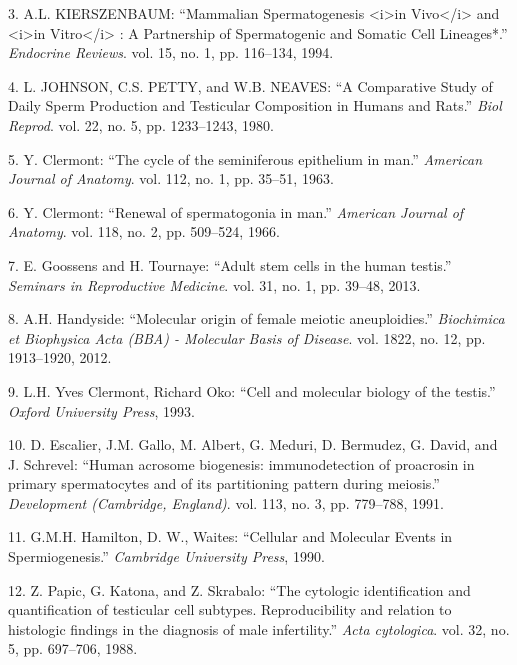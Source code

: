 \documentclass[12pt,twoside]{reedthesis}
\theoremstyle{definition}
\theoremstyle{definition}
\theoremstyle{remark}
\begin{document}
  \hypertarget{ref-KIERSZENBAUM1994}{}
  3. A.L. KIERSZENBAUM: ``Mammalian Spermatogenesis
  \textless{}i\textgreater{}in Vivo\textless{}/i\textgreater{} and
  \textless{}i\textgreater{}in Vitro\textless{}/i\textgreater{} : A
  Partnership of Spermatogenic and Somatic Cell Lineages*.''
  \emph{Endocrine Reviews}. vol. 15, no. 1, pp. 116--134, 1994.
  
  \hypertarget{ref-Johnson1980}{}
  4. L. JOHNSON, C.S. PETTY, and W.B. NEAVES: ``A Comparative Study of
  Daily Sperm Production and Testicular Composition in Humans and Rats.''
  \emph{Biol Reprod}. vol. 22, no. 5, pp. 1233--1243, 1980.
  
  \hypertarget{ref-Clermont1963}{}
  5. Y. Clermont: ``The cycle of the seminiferous epithelium in man.''
  \emph{American Journal of Anatomy}. vol. 112, no. 1, pp. 35--51, 1963.
  
  \hypertarget{ref-Clermont1966}{}
  6. Y. Clermont: ``Renewal of spermatogonia in man.'' \emph{American
  Journal of Anatomy}. vol. 118, no. 2, pp. 509--524, 1966.
  
  \hypertarget{ref-Goossens2013}{}
  7. E. Goossens and H. Tournaye: ``Adult stem cells in the human
  testis.'' \emph{Seminars in Reproductive Medicine}. vol. 31, no. 1, pp.
  39--48, 2013.
  
  \hypertarget{ref-Handyside2012}{}
  8. A.H. Handyside: ``Molecular origin of female meiotic aneuploidies.''
  \emph{Biochimica et Biophysica Acta (BBA) - Molecular Basis of Disease}.
  vol. 1822, no. 12, pp. 1913--1920, 2012.
  
  \hypertarget{ref-YvesClermontRichardOko1993}{}
  9. L.H. Yves Clermont, Richard Oko: ``Cell and molecular biology of the
  testis.'' \emph{Oxford University Press}, 1993.
  
  \hypertarget{ref-Escalier1991}{}
  10. D. Escalier, J.M. Gallo, M. Albert, G. Meduri, D. Bermudez, G.
  David, and J. Schrevel: ``Human acrosome biogenesis: immunodetection of
  proacrosin in primary spermatocytes and of its partitioning pattern
  during meiosis.'' \emph{Development (Cambridge, England)}. vol. 113, no.
  3, pp. 779--788, 1991.
  
  \hypertarget{ref-Hamilton1987}{}
  11. G.M.H. Hamilton, D. W., Waites: ``Cellular and Molecular Events in
  Spermiogenesis.'' \emph{Cambridge University Press}, 1990.
  
  \hypertarget{ref-Papic}{}
  12. Z. Papic, G. Katona, and Z. Skrabalo: ``The cytologic identification
  and quantification of testicular cell subtypes. Reproducibility and
  relation to histologic findings in the diagnosis of male infertility.''
  \emph{Acta cytologica}. vol. 32, no. 5, pp. 697--706, 1988.
  
\end{document}
